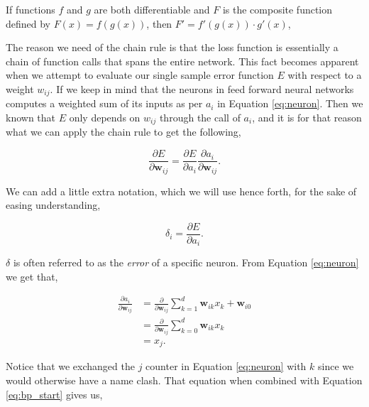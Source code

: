 \begin{lemma}
\label{lemma:chainrule}

    If functions $f$ and $g$ are both differentiable and $F$ is the composite
    function defined by $F(x) = f(g(x))$, then $F' = f'(g(x)) \cdot g'(x)$,

\end{lemma}

The reason we need of the chain rule is that the loss function is essentially
a chain of function calls that spans the entire network. This fact becomes
apparent when we attempt to evaluate our single sample error function $E$ with
respect to a weight $w_{ij}$. If we keep in mind that the neurons in feed
forward neural networks computes a weighted sum of its inputs as per $a_i$ in
Equation \eqref{eq:neuron}. Then we known that $E$ only depends on $w_{ij}$
through the call of $a_i$, and it is for that reason what we can apply the chain
rule to get the following,

\begin{equation} \label{eq:bp_start}
    \frac{\partial E}{\partial \mathbf{w}_{ij}} = \frac{\partial E}{\partial a_i}
    \frac{\partial a_i}{\partial \mathbf{w}_{ij}}.
\end{equation}

We can add a little extra notation, which we will use hence forth, for the
sake of easing understanding,

\begin{equation}\label{eq:delta}
    \delta_i = \frac{\partial E}{\partial a_i}.
\end{equation}

$\delta$ is often referred to as the \textit{error} of a specific neuron.
From Equation \eqref{eq:neuron} we get that,

\begin{align}
    \frac{\partial a_i}{\partial \mathbf{w}_{ij}}
        &= \frac{\partial}{\partial \mathbf{w}_{ij}}
            \sum_{k=1}^d \mathbf{w}_{ik} x_k + \mathbf{w}_{i0}\\
        &= \frac{\partial}{\partial \mathbf{w}_{ij}} \sum_{k = 0}^d
            \mathbf{w}_{ik} x_k\\
        &= x_j.
\end{align}

Notice that we exchanged the $j$ counter in Equation \eqref{eq:neuron} with $k$
since we would otherwise have a name clash. That equation when combined with
Equation \ref{eq:bp_start} gives us,

